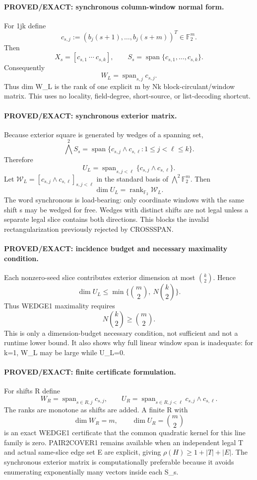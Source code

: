 \documentclass[11pt]{article}
\begin{document}
\paragraph{PROVED/EXACT: synchronous column-window normal form.}
For 1\le j\le k define
\[
c_{s,j}:=(b_j(s+1),\ldots,b_j(s+m))^T\in\mathbb F_2^m.
\]
Then
\[
\boxed{X_s=[c_{s,1}\ \cdots\ c_{s,k}],\qquad S_s=\operatorname{span}\{c_{s,1},\ldots,c_{s,k}\}.}
\]
Consequently
\[
\boxed{W_L=\operatorname{span}_{s,j}c_{s,j}.}
\]
Thus dim W_L is the rank of one explicit m by Nk block-circulant/window matrix. This uses no locality, field-degree, short-source, or list-decoding shortcut.

\paragraph{PROVED/EXACT: synchronous exterior matrix.}
Because exterior square is generated by wedges of a spanning set,
\[
\bigwedge^2 S_s=\operatorname{span}\{c_{s,j}\wedge c_{s,\ell}:1\le j<\ell\le k\}.
\]
Therefore
\[
\boxed{U_L=\operatorname{span}_{s,j<\ell}\{c_{s,j}\wedge c_{s,\ell}\}.}
\]
Let \(\mathcal W_L=[c_{s,j}\wedge c_{s,\ell}]_{s,j<\ell}\) in the standard basis of \(\bigwedge^2\mathbb F_2^m\). Then
\[
\boxed{\dim U_L=\operatorname{rank}_{\mathbb F_2}\mathcal W_L.}
\]
The word synchronous is load-bearing: only coordinate windows with the same shift s may be wedged for free. Wedges with distinct shifts are not legal unless a separate legal slice contains both directions. This blocks the invalid rectangularization previously rejected by CROSSSPAN.

\paragraph{PROVED/EXACT: incidence budget and necessary maximality condition.}
Each nonzero-seed slice contributes exterior dimension at most \(\binom{k}{2}\). Hence
\[
\boxed{\dim U_L\le\min\{\binom m2,\ N\binom k2\}.}
\]
Thus WEDGE1 maximality requires
\[
\boxed{N\binom k2\ge\binom m2.}
\]
This is only a dimension-budget necessary condition, not sufficient and not a runtime lower bound. It also shows why full linear window span is inadequate: for k=1, W_L may be large while U_L=0.

\paragraph{PROVED/EXACT: finite certificate formulation.}
For shifts R define
\[
W_R=\operatorname{span}_{s\in R,j}c_{s,j},\qquad U_R=\operatorname{span}_{s\in R,j<\ell}c_{s,j}\wedge c_{s,\ell}.
\]
The ranks are monotone as shifts are added. A finite R with
\[
\dim W_R=m,\qquad \dim U_R=\binom m2
\]
is an exact WEDGE1 certificate that the common quadratic kernel for this line family is zero. PAIR2COVER1 remains available when an independent legal T and actual same-slice edge set E are explicit, giving \(\rho(H)\ge1+|T|+|E|\). The synchronous exterior matrix is computationally preferable because it avoids enumerating exponentially many vectors inside each S_s.
\end{document}
